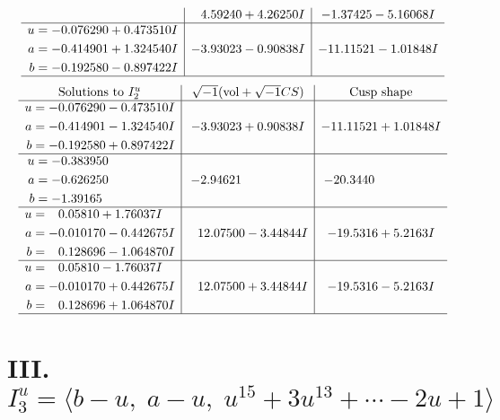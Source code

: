 \documentclass[1p]{elsarticle_modified}
\theoremstyle{definition}
\newcommand{\I}{\sqrt{-1}}
\begin{document}
$$\begin{array}{c|c|c}
 & \phantom{-}4.59240 + 4.26250 I & -1.37425 - 5.16068 I \\ \hline\begin{aligned}
u &= -0.076290 + 0.473510 I \\
a &= -0.414901 + 1.324540 I \\
b &= -0.192580 - 0.897422 I\end{aligned}
 & -3.93023 - 0.90838 I & -11.11521 - 1.01848 I\\
 \hline 
 \end{array}$$\newpage$$\begin{array}{c|c|c}  
\text{Solutions to }I^u_{2}& \I (\text{vol} + \sqrt{-1}CS) & \text{Cusp shape}\\
 \hline 
\begin{aligned}
u &= -0.076290 - 0.473510 I \\
a &= -0.414901 - 1.324540 I \\
b &= -0.192580 + 0.897422 I\end{aligned}
 & -3.93023 + 0.90838 I & -11.11521 + 1.01848 I \\ \hline\begin{aligned}
u &= -0.383950\phantom{ +0.000000I} \\
a &= -0.626250\phantom{ +0.000000I} \\
b &= -1.39165\phantom{ +0.000000I}\end{aligned}
 & -2.94621\phantom{ +0.000000I} & -20.3440\phantom{ +0.000000I} \\ \hline\begin{aligned}
u &= \phantom{-}0.05810 + 1.76037 I \\
a &= -0.010170 - 0.442675 I \\
b &= \phantom{-}0.128696 - 1.064870 I\end{aligned}
 & \phantom{-}12.07500 - 3.44844 I & -19.5316 + 5.2163 I \\ \hline\begin{aligned}
u &= \phantom{-}0.05810 - 1.76037 I \\
a &= -0.010170 + 0.442675 I \\
b &= \phantom{-}0.128696 + 1.064870 I\end{aligned}
 & \phantom{-}12.07500 + 3.44844 I & -19.5316 - 5.2163 I\\
 \hline 
 \end{array}$$\newpage\newpage\renewcommand{\arraystretch}{1}
\centering \section*{III. $I^u_{3}= \langle b- u,\;a- u,\;u^{15}+3 u^{13}+\cdots-2 u+1 \rangle$}
\end{document}
